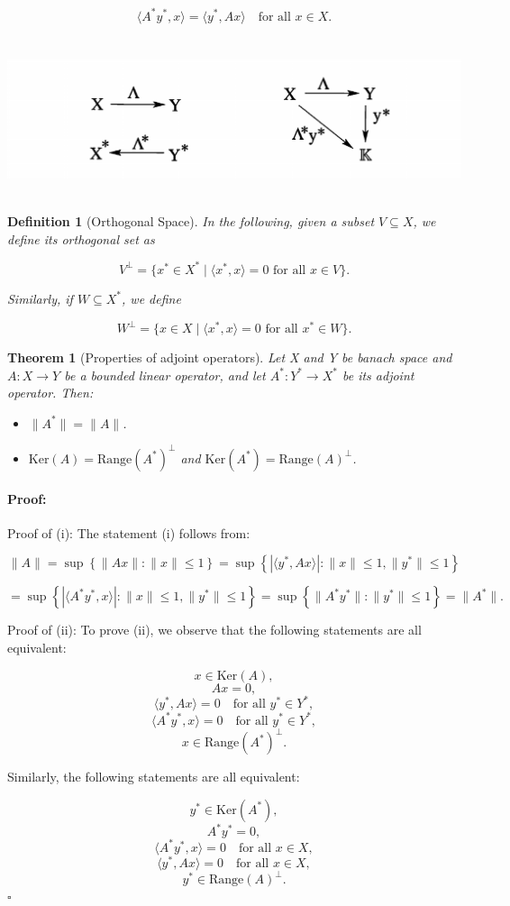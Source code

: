 \documentclass{article}
\newenvironment{proof}{\paragraph{Proof:}}{\hfill$\square$}
\newtheorem{definition}{Definition}[section]
\newtheorem{theorem}{Theorem}[section]
\begin{document}
\[
\langle A^* y^*, x\rangle  = \langle y^*, Ax\rangle  \quad \text{for all } x \in X.
\]
\\ \\
\includegraphics[width=0.75\linewidth]{adjoint.png}\\ \\
\begin{definition}[Orthogonal Space]
    
In the following, given a subset $V \subseteq X$, we define its orthogonal set as

\[
V^\perp = \{x^* \in X^* \mid \langle x^*, x\rangle  = 0 \text{ for all } x \in V\}.
\]

Similarly, if $W \subseteq X^*$, we define

\[
W^\perp = \{x \in X \mid \langle x^*, x\rangle  = 0 \text{ for all } x^* \in W\}.
\]
\end{definition}
\begin{theorem}[Properties of adjoint operators]
    Let X and Y be banach space and $A : X \to Y$ be a bounded linear operator, and let $A^* : Y^* \to X^*$ be its adjoint operator. Then:
\begin{itemize}
    \item[(i)] $\|A^*\| = \|A\|$.
    \item[(ii)] $\text{Ker}(A) = \text{Range}(A^*)^\perp$ and $\text{Ker}(A^*) = \text{Range}(A)^\perp$.
\end{itemize}
\end{theorem}
\begin{proof}
    Proof of (i): The statement (i) follows from:

    \[
    \|A\| = \sup \left\{ \|Ax\| : \|x\| \leq 1 \right\}
    = \sup \left\{ |\langle y^*, Ax\rangle | : \|x\| \leq 1, \|y^*\| \leq 1 \right\}
    \]
    
    \[
    = \sup \left\{ |\langle A^* y^*, x\rangle | : \|x\| \leq 1, \|y^*\| \leq 1 \right\}
    = \sup \left\{ \|A^* y^*\| : \|y^*\| \leq 1 \right\} 
    = \|A^*\|.
    \]
    
    Proof of (ii): To prove (ii), we observe that the following statements are all equivalent:
    
    \[
    x \in \text{Ker}(A),
    \]
    \[
    Ax = 0,
    \]
    \[
    \langle y^*, Ax\rangle  = 0 \quad \text{for all } y^* \in Y^*,
    \]
    \[
    \langle A^* y^*, x\rangle  = 0 \quad \text{for all } y^* \in Y^*,
    \]
    \[
    x \in \text{Range}(A^*)^\perp.
    \]
    
    Similarly, the following statements are all equivalent:
    
    \[
    y^* \in \text{Ker}(A^*),
    \]
    \[
    A^* y^* = 0,
    \]
    \[
    \langle A^* y^*, x\rangle  = 0 \quad \text{for all } x \in X,
    \]
    \[
    \langle y^*, Ax\rangle  = 0 \quad \text{for all } x \in X,
    \]
    \[
    y^* \in \text{Range}(A)^\perp.
    \]    
\end{proof}
\end{document}

